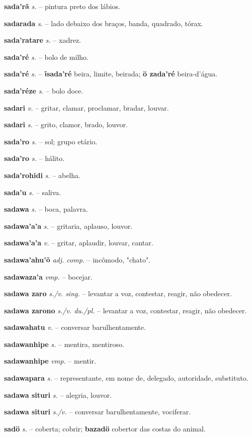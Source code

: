 \textbf{sada'rã} \textit{s.} -- pintura preto dos lábios.

\textbf{sadarada} \textit{s.} -- lado debaixo dos braços, banda, quadrado, tórax.

\textbf{sada'ratare} \textit{s.} -- xadrez.

\textbf{sada'ré} \textit{s.} -- bolo de milho.

\textbf{sada'ré} \textit{s.} -- \textbf{ĩsada'ré} beira, limite, beirada; \textbf{ö zada'ré} beira-d'água.

\textbf{sada'réze} \textit{s.} -- bolo doce.

\textbf{sadari} \textit{v.} -- gritar, clamar, proclamar, bradar, louvar.

\textbf{sadari} \textit{s.} -- grito, clamor, brado, louvor.

\textbf{sada'ro} \textit{s.} -- sol; grupo etário.

\textbf{sada'ro} \textit{s.} -- hálito.

\textbf{sada'rohidi} \textit{s.} -- abelha.

\textbf{sada'u} \textit{s.} -- saliva.

\textbf{sadawa} \textit{s.} -- boca, palavra.

\textbf{sadawa'a'a} \textit{s.} -- gritaria, aplauso, louvor.

\textbf{sadawa'a'a} \textit{v.} -- gritar, aplaudir, louvar, cantar.

\textbf{sadawa'ahu'õ} \textit{adj. comp.} -- incômodo, "chato".

\textbf{sadawaza'a} \textit{vmp.} -- bocejar.

\textbf{sadawa zaro} \textit{s./v. sing.} -- levantar a voz, contestar, reagir, não obedecer.

\textbf{sadawa zarono} \textit{s./v. du./pl.} -- levantar a voz, contestar, reagir, não obedecer.

\textbf{sadawahatu} \textit{v.} -- conversar barulhentamente.

\textbf{sadawanhipe} \textit{s.} -- mentira, mentiroso.

\textbf{sadawanhipe} \textit{vmp.} -- mentir.

\textbf{sadawapara} \textit{s.} -- representante, em nome de, delegado, autoridade, substituto.

\textbf{sadawa situri} \textit{s.} -- alegria, louvor.

\textbf{sadawa situri} \textit{s./v.} -- conversar barulhentamente, vociferar.

\textbf{sadö} \textit{s.} -- coberta; cobrir; \textbf{bazadö} cobertor das costas do animal.

